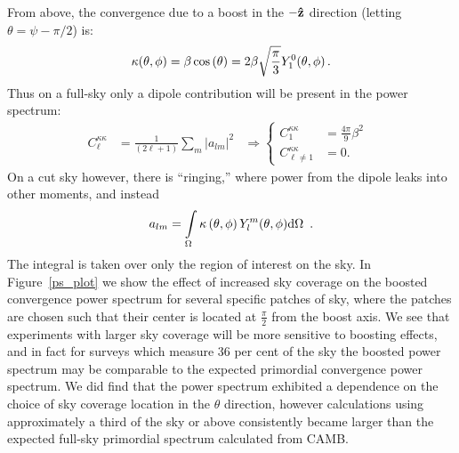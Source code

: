 \documentclass[useAMS,fleqn,usenatbib]{mn2e}
\begin{document}
From above, the convergence due to a boost in the $-{\bf\hat{z}}$ direction 
(letting $\theta =\psi-\pi/2 $) is: 
\begin{equation}
\kappa\mbox{\ensuremath{\left(\theta,\phi\right)}}=\beta\cos\left(\theta\right)=2\beta\sqrt{\frac{\pi}{3}}Y_{1}^{0}(\theta,\phi)\,.
\end{equation}
Thus on a full-sky only a dipole contribution will be present in the
power spectrum:
\begin{eqnarray}
C^{\kappa\kappa}_{\ell} & =\frac{1}{(2\ell+1)}\sum_{m}|a_{lm}|^{2} & \Rightarrow\begin{cases}
C^{\kappa\kappa}_{1} &\!\!\!\!\! = \frac{4\pi}{9}\beta^{2}\\
C^{\kappa\kappa}_{\ell\neq1} & \!\!\!\!\! =0 .
\end{cases}\,\,\,
\end{eqnarray}
 On a cut sky however, there is  ``ringing,'' where power
from the dipole leaks into other moments, and instead 
\begin{equation}
a_{lm}=\intop_{\Omega}\kappa\left(\theta,\phi\right)Y_{l}^{m}(\theta,\phi)\mathrm{d}\Omega\,\,\, .
\end{equation}
The integral is taken over only the region of interest on the sky. In Figure~\ref{ps_plot}
we show the effect of increased sky coverage on the boosted convergence power spectrum for several specific
patches of sky, where the patches are chosen such that their center is located at $\frac{\pi}{2}$ from the 
boost axis. We see that experiments with larger sky coverage will be more sensitive to boosting effects,
and in fact for surveys which measure 36 per cent of the sky the boosted power spectrum may
be comparable to the expected primordial convergence power spectrum. We did find that
the power spectrum exhibited a dependence on the choice of sky coverage location in the 
$\theta$ direction, however calculations using approximately a third of the sky or above consistently became
larger than the expected full-sky primordial spectrum calculated from CAMB.
\end{document}
